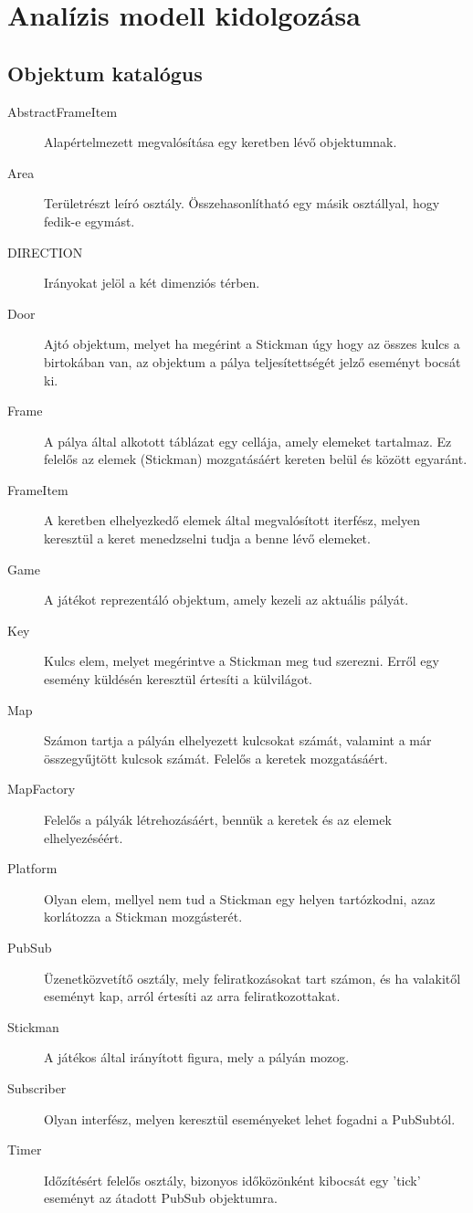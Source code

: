 

\usepackage{pdfpages}



\fedlap

\addtocounter{section}{2}
\section{Analízis modell kidolgozása}

	\subsection{Objektum katalógus}
		\begin{description}
			\item[AbstractFrameItem] Alapértelmezett megvalósítása egy keretben lévő objektumnak.
			\item[Area] Területrészt leíró osztály. Összehasonlítható egy másik osztállyal, hogy fedik-e egymást.
			\item[DIRECTION] Irányokat jelöl a két dimenziós térben.
			\item[Door] Ajtó objektum, melyet ha megérint a Stickman úgy hogy az összes kulcs a birtokában van, az objektum a pálya teljesítettségét jelző eseményt bocsát ki.
			\item[Frame] A pálya által alkotott táblázat egy cellája, amely elemeket tartalmaz. Ez felelős az elemek (Stickman) mozgatásáért kereten belül és között egyaránt.
			\item[FrameItem] A keretben elhelyezkedő elemek által megvalósított iterfész, melyen keresztül a keret menedzselni tudja a benne lévő elemeket.
			\item[Game] A játékot reprezentáló objektum, amely kezeli az aktuális pályát.
			\item[Key] Kulcs elem, melyet megérintve a Stickman meg tud szerezni. Erről egy esemény küldésén keresztül értesíti a külvilágot.
			\item[Map] Számon tartja a pályán elhelyezett kulcsokat számát, valamint a már összegyűjtött kulcsok számát. Felelős a keretek mozgatásáért.
			\item[MapFactory] Felelős a pályák létrehozásáért, bennük a keretek és az elemek elhelyezéséért.
			\item[Platform] Olyan elem, mellyel nem tud a Stickman egy helyen tartózkodni, azaz korlátozza a Stickman mozgásterét.
			\item[PubSub] Üzenetközvetítő osztály, mely feliratkozásokat tart számon, és ha valakitől eseményt kap, arról értesíti az arra feliratkozottakat.
			\item[Stickman] A játékos által irányított figura, mely a pályán mozog.
			\item[Subscriber] Olyan interfész, melyen keresztül eseményeket lehet fogadni a PubSubtól.
			\item[Timer] Időzítésért felelős osztály, bizonyos időközönként kibocsát egy 'tick' eseményt az átadott PubSub objektumra.
		\end{description}
	
